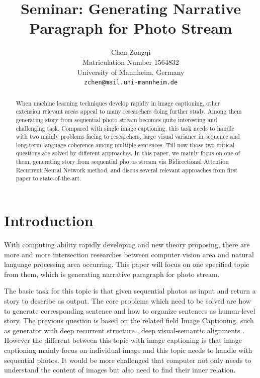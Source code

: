 \documentclass[11pt]{article}
\title{Seminar: Generating Narrative Paragraph for Photo Stream }
\author{Chen Zongqi\\
	    Matriculation Number 1564832\\
	    University of Mannheim, Germany\\
	    {\tt zchen@mail.uni-mannheim.de}}
\date{}
\begin{document}
\maketitle

\begin{abstract}
When machine learning techniques develop rapidly in image captioning, other extension relevant areas appeal to many researchers doing further study. Among them generating story from sequential photo stream becomes quite interesting and challenging task. Compared with single image captioning, this task needs to handle with two mainly problems facing to researchers, large visual variance in sequence and long-term language coherence among multiple sentences. Till now those two critical questions are solved by different approaches. In this paper, we mainly focus on one of them, generating story from sequential photos stream via Bidirectional Attention Recurrent Neural Network method, and discus several relevant approaches from first paper to state-of-the-art.   
\end{abstract}

\section{Introduction}
With computing ability rapidly developing and new theory proposing, there are more and more intersection researches between computer vision area and natural language processing area occurring. This paper will focus on one specified topic from them, which is generating narrative paragraph for photo stream.  	

The basic task for this topic is that given sequential photos as input and return a story to describe as output. The core problems which need to be solved are how to generate corresponding sentence and how to organize sentences as human-level story. The previous question is based on the related field Image Captioning, such as generator with deep recurrent structure \cite{vinyals2014neural}, deep visual-semantic alignments  \cite{Karpathy:2017:DVA:3069214.3069250}. However the different between this topic with image captioning is that image captioning mainly focus on individual image and this topic needs to handle with sequential photos. It would be more challenged that computer not only needs to understand the content of images but also need to find their inner relation.   
\end{document}
